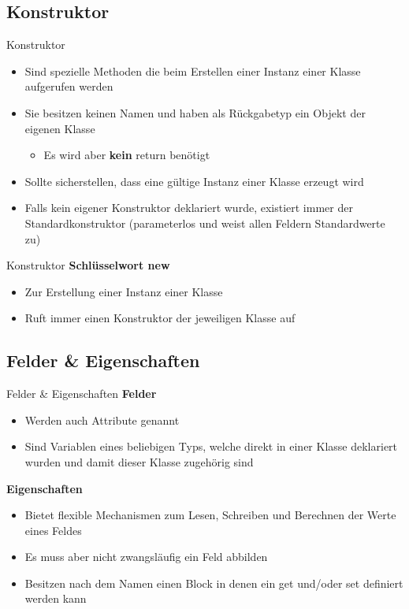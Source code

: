 \subsection{Konstruktor}
\begin{frame}{Konstruktor}
	\begin{itemize}
		\item Sind spezielle Methoden die beim Erstellen einer Instanz einer Klasse aufgerufen werden
		\item Sie besitzen keinen Namen und haben als Rückgabetyp ein Objekt der eigenen Klasse
		\begin{itemize}
			\item Es wird aber \textbf{kein} \alert{return} benötigt
		\end{itemize}
		\item Sollte sicherstellen, dass eine gültige Instanz einer Klasse erzeugt wird
		\item Falls kein eigener Konstruktor deklariert wurde, existiert immer der Standardkonstruktor (parameterlos und weist allen Feldern Standardwerte zu)
	\end{itemize}
		
\end{frame}

\begin{frame}{Konstruktor}
	\textbf{Schlüsselwort new}\\
	\begin{itemize}
		\item Zur Erstellung einer Instanz einer Klasse
		\item Ruft immer einen Konstruktor der jeweiligen Klasse auf
	\end{itemize}
	
\end{frame}

\subsection{Felder \& Eigenschaften}
\begin{frame}{Felder \& Eigenschaften}
	\textbf{Felder}\\
	\begin{itemize}
		\item Werden auch Attribute genannt
		\item Sind Variablen eines beliebigen Typs, welche direkt in einer Klasse deklariert wurden und damit dieser Klasse zugehörig sind
	\end{itemize}
	\textbf{Eigenschaften}\\
	\begin{itemize}
		\item Bietet flexible Mechanismen zum Lesen, Schreiben und Berechnen der Werte eines Feldes
		\item Es muss aber nicht zwangsläufig ein Feld abbilden
		\item Besitzen nach dem Namen einen Block in denen ein \alert{get} und/oder \alert{set} definiert werden kann
	\end{itemize}
\end{frame}

